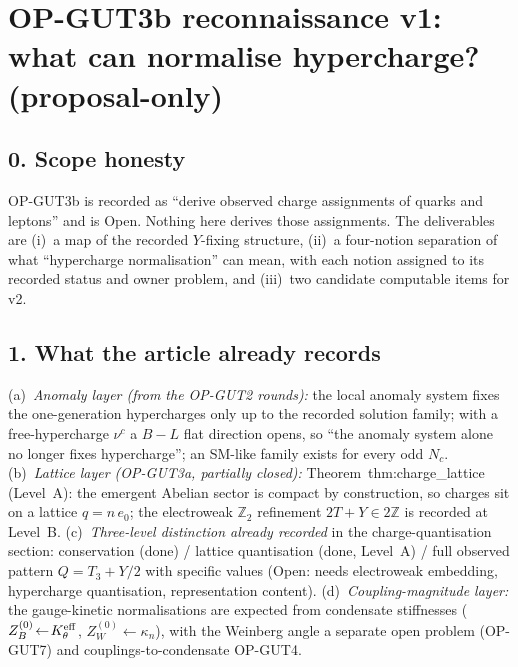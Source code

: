 \section*{OP-GUT3b reconnaissance v1: what can normalise
hypercharge? (proposal-only)}

\subsection*{0. Scope honesty}
OP-GUT3b is recorded as ``derive observed charge assignments of
quarks and leptons'' and is Open.
Nothing here derives those assignments.
The deliverables are (i)~a map of the recorded $Y$-fixing
structure, (ii)~a four-notion separation of what ``hypercharge
normalisation'' can mean, with each notion assigned to its
recorded status and owner problem, and (iii)~two candidate
computable items for v2.

\subsection*{1. What the article already records}
(a)~\emph{Anomaly layer (from the OP-GUT2 rounds):} the local
anomaly system fixes the one-generation hypercharges only up to
the recorded solution family; with a free-hypercharge $\nu^c$ a
$B{-}L$ flat direction opens, so ``the anomaly system alone no
longer fixes hypercharge''; an SM-like family exists for every odd
$N_c$.
(b)~\emph{Lattice layer (OP-GUT3a, partially closed):}
Theorem~thm:charge\_lattice (Level~A): the emergent Abelian sector
is compact by construction, so charges sit on a lattice
$q=n\,e_0$; the electroweak $\mathbb Z_2$ refinement
$2T+Y\in2\mathbb Z$ is recorded at Level~B.
(c)~\emph{Three-level distinction already recorded} in the
charge-quantisation section: conservation (done) /
lattice quantisation (done, Level~A) / full observed pattern
$Q=T_3+Y/2$ with specific values (Open: needs electroweak
embedding, hypercharge quantisation, representation content).
(d)~\emph{Coupling-magnitude layer:} the gauge-kinetic
normalisations are expected from condensate stiffnesses
($Z_B^{(0)}\!\leftarrow\!K_\theta^{\rm eff}$,
$Z_W^{(0)}\!\leftarrow\!\kappa_n$), with the Weinberg angle a
separate open problem (OP-GUT7) and couplings-to-condensate
OP-GUT4.

